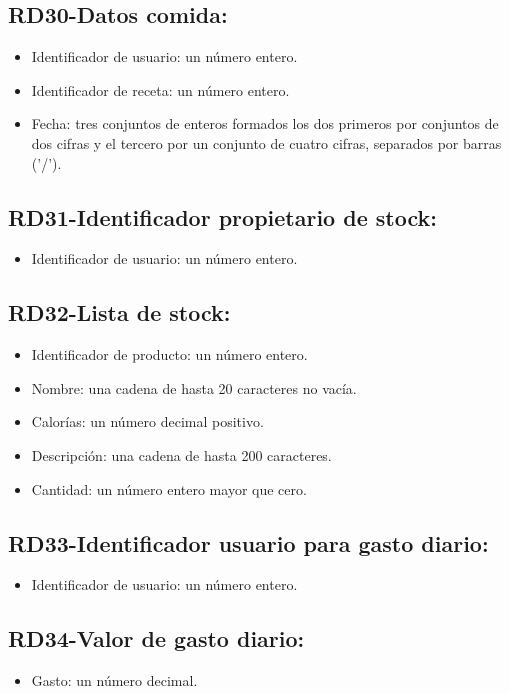 \documentclass[a4paper,12pt]{report}
\begin{document}
\subsection{RD30-Datos comida:}
\label{sec-2-1-30}
\begin{itemize}
\item Identificador de usuario: un número entero.
\item Identificador de receta: un número entero.
\item Fecha: tres conjuntos de enteros formados los dos primeros por conjuntos de dos cifras y el                 tercero por un conjunto de cuatro cifras, separados por barras ('/').
\end{itemize}
\subsection{RD31-Identificador propietario de stock:}
\label{sec-2-1-31}
\begin{itemize}
\item Identificador de usuario: un número entero.
\end{itemize}
\subsection{RD32-Lista de stock:}
\label{sec-2-1-32}
\begin{itemize}
\item Identificador de producto: un número entero.
\item Nombre: una cadena de hasta 20 caracteres no vacía.
\item Calorías: un número decimal positivo.
\item Descripción: una cadena de hasta 200 caracteres.
\item Cantidad: un número entero mayor que cero.
\end{itemize}
\subsection{RD33-Identificador usuario para gasto diario:}
\label{sec-2-1-33}
\begin{itemize}
\item Identificador de usuario: un número entero.
\end{itemize}
\subsection{RD34-Valor de gasto diario:}
\label{sec-2-1-34}
\begin{itemize}
\item Gasto: un número decimal.
\end{itemize}
\end{document}
